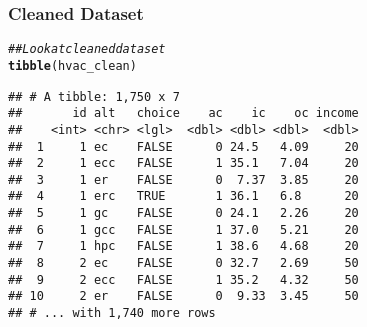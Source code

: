 \documentclass{beamer}\usepackage[]{graphicx}\usepackage[]{color}
\makeatletter
\newcommand{\hlnum}[1]{\textcolor[rgb]{0.686,0.059,0.569}{#1}}%
\newcommand{\hlcom}[1]{\textcolor[rgb]{0.678,0.584,0.686}{\textit{#1}}}%
\newcommand{\hlopt}[1]{\textcolor[rgb]{0,0,0}{#1}}%
\newcommand{\hlstd}[1]{\textcolor[rgb]{0.345,0.345,0.345}{#1}}%
\newcommand{\hlkwb}[1]{\textcolor[rgb]{0.69,0.353,0.396}{#1}}%
\newcommand{\hlkwc}[1]{\textcolor[rgb]{0.333,0.667,0.333}{#1}}%
\newcommand{\hlkwd}[1]{\textcolor[rgb]{0.737,0.353,0.396}{\textbf{#1}}}%
\newenvironment{kframe}{%
 \def\at@end@of@kframe{}%
 \ifinner\ifhmode%
  \def\at@end@of@kframe{\end{minipage}}%
  \begin{minipage}{\columnwidth}%
 \fi\fi%
 \def\FrameCommand##1{\hskip\@totalleftmargin \hskip-\fboxsep
 \colorbox{shadecolor}{##1}\hskip-\fboxsep
     \hskip-\linewidth \hskip-\@totalleftmargin \hskip\columnwidth}%
 \MakeFramed {\advance\hsize-\width
   \@totalleftmargin\z@ \linewidth\hsize
   \@setminipage}}%
 {\par\unskip\endMakeFramed%
 \at@end@of@kframe}
\newenvironment{knitrout}{}{} %
\makeatother
\begin{document}

\begin{frame}[fragile]\frametitle{Cleaned Dataset}
\begin{knitrout}\footnotesize
{}\color{fgcolor}\begin{kframe}
\begin{alltt}
\hlcom{## Look at cleaned dataset}
\hlkwd{tibble}\hlstd{(hvac_clean)}
\end{alltt}
\begin{verbatim}
## # A tibble: 1,750 x 7
##       id alt   choice    ac    ic    oc income
##    <int> <chr> <lgl>  <dbl> <dbl> <dbl>  <dbl>
##  1     1 ec    FALSE      0 24.5   4.09     20
##  2     1 ecc   FALSE      1 35.1   7.04     20
##  3     1 er    FALSE      0  7.37  3.85     20
##  4     1 erc   TRUE       1 36.1   6.8      20
##  5     1 gc    FALSE      0 24.1   2.26     20
##  6     1 gcc   FALSE      1 37.0   5.21     20
##  7     1 hpc   FALSE      1 38.6   4.68     20
##  8     2 ec    FALSE      0 32.7   2.69     50
##  9     2 ecc   FALSE      1 35.2   4.32     50
## 10     2 er    FALSE      0  9.33  3.45     50
## # ... with 1,740 more rows
\end{verbatim}
\end{kframe}
\end{knitrout}
\end{frame}
\end{document}
